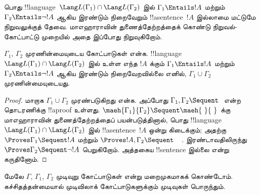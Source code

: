 \documentclass[../../../include/open-logic-section]{subfiles}
\begin{document}
பொது !!{language}~$\Lang L(\Gamma_1) \cap
\Lang L(\Gamma_2)$ இல் $\Gamma_1 \Entails !A$ மற்றும்
$\Gamma_2 \Entails \lnot !A$ ஆகிய இரண்டும் நிறைவேறும்
!!a{sentence}~$!A$ இல்லாமை மட்டுமே நிறுவலுக்குத் தேவை.
மாஎஹாராவின் துணைத்தேற்றத்தைக் கொண்டு நிறுவல்-கோட்பாட்டு முறையில்
அதை இப்போது நிறுவுகிறோம்.

\begin{thm}[ராபின்சனின் கூட்டு முரணின்மைத் தேற்றம்]
$\Gamma_1$, $\Gamma_2$ முரணின்மையுடைய கோட்பாடுகள் என்க.
!!{language}~$\Lang L(\Gamma_1) \cap \Lang L(\Gamma_2)$ இல்
உள்ள எந்த $!A$ க்கும் $\Gamma_1 \Entails !A$ மற்றும்
$\Gamma_2 \Entails \lnot !A$ ஆகிய இரண்டும் நிறைவேறவில்லை
எனில், $\Gamma_1 \cup \Gamma_2$ முரணின்மையுடையது.
\end{thm}

\begin{proof}
  மாறாக $\Gamma_1 \cup \Gamma_2$ முரண்படுகிறது என்க.
  அப்போது $\Gamma_1, \Gamma_2 \Sequent \ $ என்ற தொடரணிக்கு
  !!a{proof} உள்ளது. $\maeh{\Gamma_1}{\Gamma_2}
  \Sequent \maeh{\ }{\ }$ க்கு மாஎஹாராவின் துணைத்தேற்றத்தைப்
  பயன்படுத்தினால், பொது !!{language}~$\Lang L(\Gamma_1) \cap
  \Lang L(\Gamma_2)$ இல் !!a{sentence}~$!A$ ஒன்று கிடைக்கும்;
  அதற்கு $\Proves \Gamma_1 \Sequent !A$ மற்றும்
  $\Proves !A, \Gamma_2 \Sequent \quad$.
  இரண்டாவதிலிருந்து $\Proves \Gamma_2 \Sequent \lnot !A$
  பெறுகிறோம். அத்தகைய !!{sentence} இல்லை என்று கருதினோம்.
\end{proof}

மேலே $\Gamma$, $\Gamma_1$, $\Gamma_2$ முடிவுறு கோட்பாடுகள்
என்று மறைமுகமாகக் கொண்டோம். கச்சிதத்தன்மையால் முடிவிலாக்
கோட்பாடுகளுக்கும் முடிவுகள் பொருந்தும்.
\end{document}
